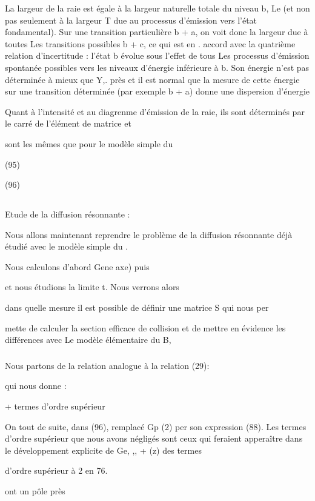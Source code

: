 La largeur de la raie est égale à la largeur naturelle totale
du niveau b, Le (et non pas seulement à la largeur T due au processus d'émission vers l'état fondamental). Sur une transition particulière b + a, on voit
donc la largeur due à toutes Les transitions possibles b + c, ce qui est en .
accord avec la quatrième relation d'incertitude : l'état b évolue sous l'effet
de tous Les processus d'émission spontanée possibles vers les niveaux
d'énergie inférieure à b. Son énergie n'est pas déterminée à mieux que Y,.
près et il est normal que la mesure de cette énergie sur une transition
déterminée (par exemple b + a) donne une dispersion d'énergie 

Quant à l'intensité et au diagrenme d'émission de la raie, ils
sont déterminés par le carré de l'élément de matrice  et

sont les mêmes que pour le modèle simple du

(95)

(96)

\subsection{} Etude de la diffusion résonnante :%

Nous allons maintenant reprendre le problème de la diffusion
résonnante déjà étudié avec le modèle simple du .

Nous calculons d'abord Gene axe) puis

et nous étudions la limite t. Nous verrons alors

dans quelle mesure il est possible de définir une matrice S qui nous per

mette de calculer la section efficace de collision et de mettre en évidence
les différences avec Le modèle élémentaire du  B,
\subsubsection{}%
Nous partons de la relation analogue à la relation (29):

qui nous donne : 

+ termes d'ordre supérieur

On  tout de suite, dans (96), remplacé Gp (2) per son expression (88).
Les termes d'ordre supérieur que nous avons négligés sont ceux qui feraient
apperaître dans le développement explicite de Ge, ,, + (z) des termes

d'ordre supérieur à 2 en 76.

ont un pôle près


